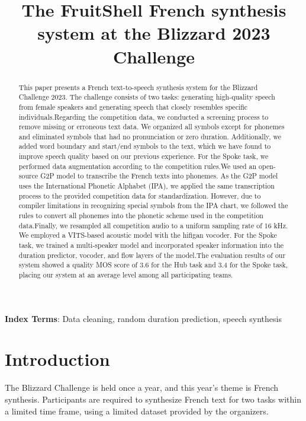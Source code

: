 \documentclass{INTERSPEECH2023}
\title{The FruitShell French synthesis system at the Blizzard 2023 Challenge}
\begin{document}
\maketitle

\begin{abstract}
This paper presents a French text-to-speech synthesis system for the Blizzard Challenge 2023. The challenge consists of two tasks: generating high-quality speech from female speakers and generating speech that closely resembles specific individuals.Regarding the competition data, we conducted a screening process to remove missing or erroneous text data. We organized all symbols except for phonemes and eliminated symbols that had no pronunciation or zero duration. Additionally, we added word boundary and start/end symbols to the text, which we have found to improve speech quality based on our previous experience. For the Spoke task, we performed data augmentation according to the competition rules.We used an open-source G2P model to transcribe the French texts into phonemes. As the G2P model uses the International Phonetic Alphabet (IPA), we applied the same transcription process to the provided competition data for standardization. However, due to compiler limitations in recognizing special symbols from the IPA chart, we followed the rules to convert all phonemes into the phonetic scheme used in the competition data.Finally, we resampled all competition audio to a uniform sampling rate of 16 kHz. We employed a VITS-based acoustic model with the hifigan vocoder. For the Spoke task, we trained a multi-speaker model and incorporated speaker information into the duration predictor, vocoder, and flow layers of the model.The evaluation results of our system showed a quality MOS score of 3.6 for the Hub task and 3.4 for the Spoke task, placing our system at an average level among all participating teams.
\end{abstract}
\noindent\textbf{Index Terms}: Data cleaning, random duration prediction, speech synthesis

\section{Introduction}

The Blizzard Challenge is held once a year, and this year's theme is French synthesis. Participants are required to synthesize French text for two tasks within a limited time frame, using a limited dataset provided by the organizers. 
\end{document}
